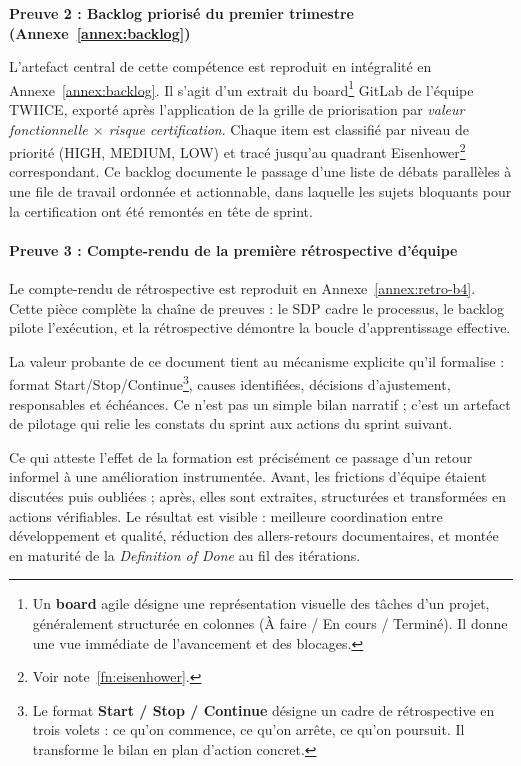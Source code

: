 \medskip\noindent\textbf{Preuve 2 : Backlog\footnotemark{} priorisé du premier trimestre (Annexe~\ref{annex:backlog})}\par\smallskip
{}

L'artefact central de cette compétence est reproduit en intégralité en Annexe~\ref{annex:backlog}. Il s'agit d'un extrait du board\footnote{Un \textbf{board} agile désigne une représentation visuelle des tâches d'un projet, généralement structurée en colonnes (À faire / En cours / Terminé). Il donne une vue immédiate de l'avancement et des blocages.} GitLab de l'équipe TWIICE, exporté après l'application de la grille de priorisation par \emph{valeur fonctionnelle $\times$ risque certification}. Chaque item est classifié par niveau de priorité (HIGH, MEDIUM, LOW) et tracé jusqu'au quadrant Eisenhower\footnote{Voir note~\ref{fn:eisenhower}.} correspondant. Ce backlog documente le passage d'une liste de débats parallèles à une file de travail ordonnée et actionnable, dans laquelle les sujets bloquants pour la certification ont été remontés en tête de sprint.

\paragraph{Preuve 3 : Compte-rendu de la première rétrospective d'équipe}

Le compte-rendu de rétrospective est reproduit en Annexe~\ref{annex:retro-b4}. Cette pièce complète la chaîne de preuves : le SDP cadre le processus, le backlog pilote l'exécution, et la rétrospective démontre la boucle d'apprentissage effective.

La valeur probante de ce document tient au mécanisme explicite qu'il formalise : format Start/Stop/Continue\footnote{Le format \textbf{Start / Stop / Continue} désigne un cadre de rétrospective en trois volets : ce qu'on commence, ce qu'on arrête, ce qu'on poursuit. Il transforme le bilan en plan d'action concret.}, causes identifiées, décisions d'ajustement, responsables et échéances. Ce n'est pas un simple bilan narratif ; c'est un artefact de pilotage qui relie les constats du sprint aux actions du sprint suivant.

Ce qui atteste l'effet de la formation est précisément ce passage d'un retour informel à une amélioration instrumentée. Avant, les frictions d'équipe étaient discutées puis oubliées ; après, elles sont extraites, structurées et transformées en actions vérifiables. Le résultat est visible : meilleure coordination entre développement et qualité, réduction des allers-retours documentaires, et montée en maturité de la \textit{Definition of Done} au fil des itérations.

